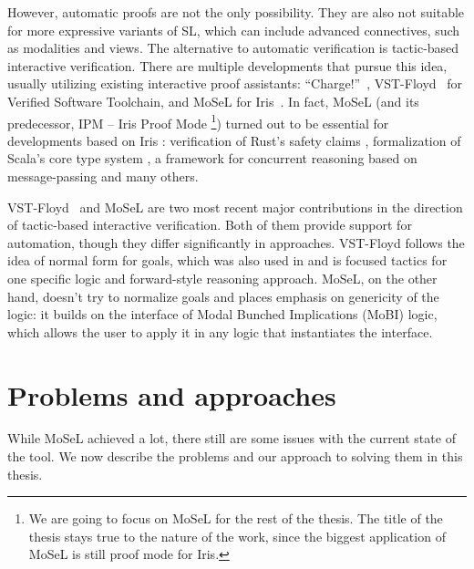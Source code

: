 However, automatic proofs are not the only possibility.
They are also not suitable for more expressive variants of SL, which can include advanced connectives, such as modalities and views.
The alternative to automatic verification is tactic-based interactive verification.
There are multiple developments that pursue this idea, usually utilizing existing interactive proof assistants: ``Charge!''~\cite{bengtsonCharge2012}, VST-Floyd~\cite{caoVSTFloydSeparationLogic2018} for Verified Software Toolchain, and MoSeL for Iris~\cite{krebbersInteractiveProofsHigherorder2017, krebbersMoSeLGeneralExtensible2018}.
{
In fact, MoSeL (and its predecessor, IPM -- Iris Proof Mode \footnote{We are going to focus on MoSeL for the rest of the thesis. The title of the thesis stays true to the nature of the work, since the biggest application of MoSeL is still proof mode for Iris.}) turned out to be essential for developments based on Iris \cite{krebbersMoSeLGeneralExtensible2018, jungUnderstandingEvolvingRust2020}: verification of Rust's safety claims \cite{jungRustBeltSecuringFoundations2018, jungStackedBorrowsAliasing2019, dangRustBeltMeetsRelaxed2019}, formalization of Scala's core type system \cite{giarrussoScalaStepbystepSoundness2020}, a framework for concurrent reasoning based on message-passing \cite{hinrichsenActrisSessiontypeBased2019} and many others.}

VST-Floyd~\cite{caoVSTFloydSeparationLogic2018} and MoSeL \cite{krebbersMoSeLGeneralExtensible2018} are two most recent major contributions in the direction of tactic-based interactive verification.
Both of them provide support for automation, though they differ significantly in approaches.
VST-Floyd follows the idea of normal form for goals, which was also used in \cite{bengtsonCharge2012} and is focused tactics for one specific logic and forward-style reasoning approach.
MoSeL, on the other hand, doesn't try to normalize goals and places emphasis on genericity of the logic: it builds on the interface of Modal Bunched Implications (MoBI) logic, which allows the user to apply it in any logic that instantiates the interface.

\section{Problems and approaches}
\label{sec:problems-approaches-intro}

While MoSeL achieved a lot, there still are some issues with the current state of the tool.
We now describe the problems and our approach to solving them in this thesis.


